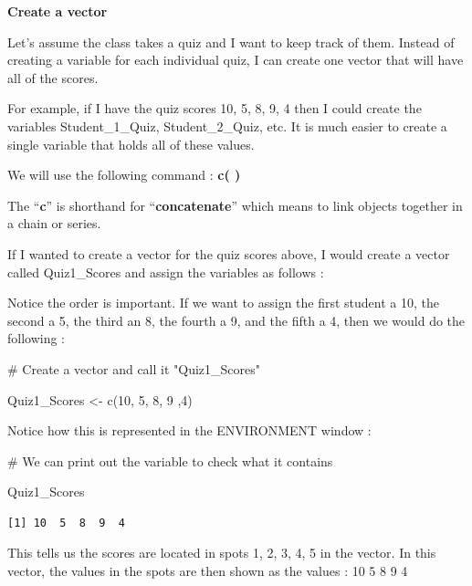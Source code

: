 \documentclass[
  letterpaper,
  DIV=11,
  numbers=noendperiod]{scrreprt}
\newenvironment{Shaded}{\begin{snugshade}}{\end{snugshade}}
\newcommand{\CommentTok}[1]{\textcolor[rgb]{0.37,0.37,0.37}{#1}}
\newcommand{\DecValTok}[1]{\textcolor[rgb]{0.68,0.00,0.00}{#1}}
\newcommand{\FunctionTok}[1]{\textcolor[rgb]{0.28,0.35,0.67}{#1}}
\newcommand{\NormalTok}[1]{\textcolor[rgb]{0.00,0.23,0.31}{#1}}
\newcommand{\OtherTok}[1]{\textcolor[rgb]{0.00,0.23,0.31}{#1}}
\begin{document}
\textbf{Create a vector}

Let's assume the class takes a quiz and I want to keep track of them.
Instead of creating a variable for each individual quiz, I can create
one vector that will have all of the scores.

For example, if I have the quiz scores 10, 5, 8, 9, 4 then I could
create the variables Student\_1\_Quiz, Student\_2\_Quiz, etc. It is much
easier to create a single variable that holds all of these values.

We will use the following command : \textbf{c( )}

The ``\textbf{c}'' is shorthand for ``\textbf{concatenate}'' which means
to link objects together in a chain or series.

If I wanted to create a vector for the quiz scores above, I would create
a vector called Quiz1\_Scores and assign the variables as follows :

Notice the order is important. If we want to assign the first student a
10, the second a 5, the third an 8, the fourth a 9, and the fifth a 4,
then we would do the following :

\begin{Shaded}
\begin{Highlighting}[]
\CommentTok{\# Create a vector and call it "Quiz1\_Scores" }

\NormalTok{Quiz1\_Scores }\OtherTok{\textless{}{-}} \FunctionTok{c}\NormalTok{(}\DecValTok{10}\NormalTok{, }\DecValTok{5}\NormalTok{, }\DecValTok{8}\NormalTok{, }\DecValTok{9}\NormalTok{ ,}\DecValTok{4}\NormalTok{)}
\end{Highlighting}
\end{Shaded}

Notice how this is represented in the ENVIRONMENT window :

\begin{Shaded}
\begin{Highlighting}[]
\CommentTok{\# We can print out the variable to check what it contains}

\NormalTok{Quiz1\_Scores     }
\end{Highlighting}
\end{Shaded}

\begin{verbatim}
[1] 10  5  8  9  4
\end{verbatim}

This tells us the scores are located in spots 1, 2, 3, 4, 5 in the
vector. In this vector, the values in the spots are then shown as the
values : 10 5 8 9 4
\end{document}
